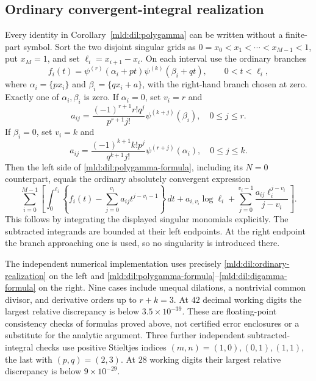 \subsection{Ordinary convergent-integral realization}
Every identity in Corollary~\ref{mld:dil:polygamma} can be written without
a finite-part symbol.  Sort the two disjoint singular grids as
$0=x_0<x_1<\cdots<x_{M-1}<1$, put $x_M=1$, and set
$\ell_i=x_{i+1}-x_i$.  On each interval use the ordinary branches
\[
 f_i(t)=\psi^{(r)}(\alpha_i+pt)
        \psi^{(k)}(\beta_i+qt),\qquad0<t<\ell_i,
\]
where $\alpha_i=\{px_i\}$ and $\beta_i=\{qx_i+a\}$, with the
right-hand branch chosen at zero.  Exactly one of $\alpha_i,\beta_i$
is zero.  If $\alpha_i=0$, set $v_i=r$ and
\[
 a_{ij}=\frac{(-1)^{r+1}r!q^j}{p^{r+1}j!}
                       \psi^{(k+j)}(\beta_i),\quad0\le j\le r.
\]
If $\beta_i=0$, set $v_i=k$ and
\[
 a_{ij}=\frac{(-1)^{k+1}k!p^j}{q^{k+1}j!}
                       \psi^{(r+j)}(\alpha_i),\quad0\le j\le k.
\]
Then the left side of \eqref{mld:dil:polygamma-formula}, including its
$N=0$ counterpart, equals the ordinary absolutely convergent expression
\begin{equation}
 \sum_{i=0}^{M-1}\left[
  \int_0^{\ell_i}\left\{f_i(t)
               -\sum_{j=0}^{v_i}a_{ij}t^{j-v_i-1}\right\}\,dt
  +a_{i,v_i}\log\ell_i
  +\sum_{j=0}^{v_i-1}\frac{a_{ij}\ell_i^{j-v_i}}{j-v_i}
                           \right].
 \label{mld:dil:ordinary-realization}
\end{equation}
This follows by integrating the displayed singular monomials explicitly.
The subtracted integrands are bounded at their left endpoints.  At the
right endpoint the branch approaching one is used, so no singularity
is introduced there.

The independent numerical implementation uses precisely
\eqref{mld:dil:ordinary-realization} on the left and
\eqref{mld:dil:polygamma-formula}--\eqref{mld:dil:digamma-formula} on the right.
Nine cases include unequal dilations, a nontrivial common divisor, and
derivative orders up to $r+k=3$.  At $42$ decimal working digits the
largest relative discrepancy is below $3.5\times10^{-39}$.  These are
floating-point consistency checks of formulas proved above, not certified
error enclosures or a substitute for the analytic argument.
Three further independent subtracted-integral checks use positive
Stieltjes indices $(m,n)=(1,0),(0,1),(1,1)$, the last with
$(p,q)=(2,3)$.  At $28$ working digits their largest relative discrepancy
is below $9\times10^{-29}$.


